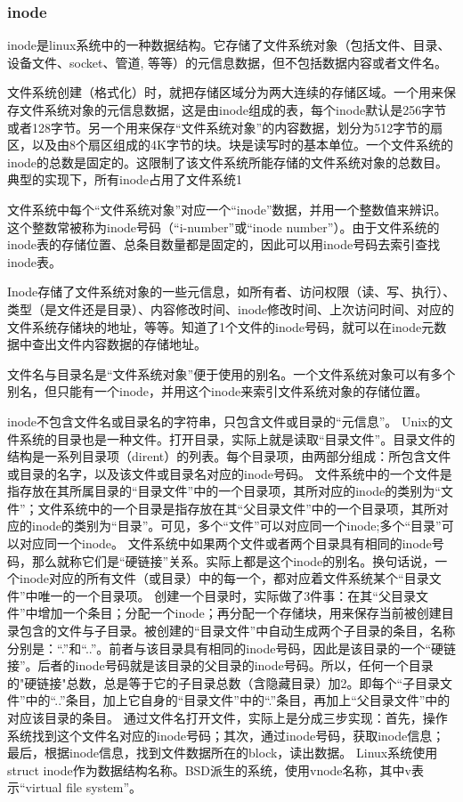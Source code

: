 \documentclass{beamer}
\begin{document}
\begin{frame}
\frametitle{inode}
inode是linux系统中的一种数据结构。它存储了文件系统对象（包括文件、目录、设备文件、socket、管道, 等等）的元信息数据，但不包括数据内容或者文件名。

文件系统创建（格式化）时，就把存储区域分为两大连续的存储区域。一个用来保存文件系统对象的元信息数据，这是由inode组成的表，每个inode默认是256字节或者128字节。另一个用来保存“文件系统对象”的内容数据，划分为512字节的扇区，以及由8个扇区组成的4K字节的块。块是读写时的基本单位。一个文件系统的inode的总数是固定的。这限制了该文件系统所能存储的文件系统对象的总数目。典型的实现下，所有inode占用了文件系统1%

文件系统中每个“文件系统对象”对应一个“inode”数据，并用一个整数值来辨识。这个整数常被称为inode号码（“i-number”或“inode number”）。由于文件系统的inode表的存储位置、总条目数量都是固定的，因此可以用inode号码去索引查找inode表。

Inode存储了文件系统对象的一些元信息，如所有者、访问权限（读、写、执行）、类型（是文件还是目录）、内容修改时间、inode修改时间、上次访问时间、对应的文件系统存储块的地址，等等。知道了1个文件的inode号码，就可以在inode元数据中查出文件内容数据的存储地址。

文件名与目录名是“文件系统对象”便于使用的别名。一个文件系统对象可以有多个别名，但只能有一个inode，并用这个inode来索引文件系统对象的存储位置。


inode不包含文件名或目录名的字符串，只包含文件或目录的“元信息”。
Unix的文件系统的目录也是一种文件。打开目录，实际上就是读取“目录文件”。目录文件的结构是一系列目录项（dirent）的列表。每个目录项，由两部分组成：所包含文件或目录的名字，以及该文件或目录名对应的inode号码。
文件系统中的一个文件是指存放在其所属目录的“目录文件”中的一个目录项，其所对应的inode的类别为“文件”；文件系统中的一个目录是指存放在其“父目录文件”中的一个目录项，其所对应的inode的类别为“目录”。可见，多个“文件”可以对应同一个inode;多个“目录”可以对应同一个inode。
文件系统中如果两个文件或者两个目录具有相同的inode号码，那么就称它们是“硬链接”关系。实际上都是这个inode的别名。换句话说，一个inode对应的所有文件（或目录）中的每一个，都对应着文件系统某个“目录文件”中唯一的一个目录项。
创建一个目录时，实际做了3件事：在其“父目录文件”中增加一个条目；分配一个inode；再分配一个存储块，用来保存当前被创建目录包含的文件与子目录。被创建的“目录文件”中自动生成两个子目录的条目，名称分别是：“.”和“..”。前者与该目录具有相同的inode号码，因此是该目录的一个“硬链接”。后者的inode号码就是该目录的父目录的inode号码。所以，任何一个目录的"硬链接"总数，总是等于它的子目录总数（含隐藏目录）加2。即每个“子目录文件”中的“..”条目，加上它自身的“目录文件”中的“.”条目，再加上“父目录文件”中的对应该目录的条目。
通过文件名打开文件，实际上是分成三步实现：首先，操作系统找到这个文件名对应的inode号码；其次，通过inode号码，获取inode信息；最后，根据inode信息，找到文件数据所在的block，读出数据。
Linux系统使用struct inode作为数据结构名称。BSD派生的系统，使用vnode名称，其中v表示“virtual file system”。



\end{frame}
\end{document}
